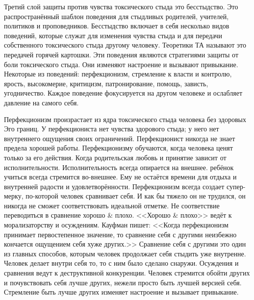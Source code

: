\documentclass[10pt, fleqn]{article}
\begin{document}
Третий слой защиты против чувства токсического стыда это бесстыдство. Это распространённый шаблон поведения для стыдливых родителей, учителей, политиков и проповедников. Бесстыдство включает в себя несколько видов поведений, которые служат для изменения чувства стыда и для передачи собственного токсического стыда другому человеку. Теоретики ТА называют это передачей горячей картошки. Эти поведения являются стратегиями защиты от боли токсического стыда. Они изменяют настроение и вызывают привыкание. Некоторые из поведений: перфекционизм, стремление к власти и контролю, ярость, высокомерие, критицизм, патронирование, помощь, зависть, угодничество. Каждое поведение фокусируется на другом человеке и ослабляет давление на самого себя.


Перфекционизм произрастает из ядра токсического стыда человека без здоровых Эго границ. У перфекциониста нет чувства здорового стыда; у него нет внутреннего ощущения своих ограничений. Перфекционист никогда не знает предела хорошей работы.
Перфекционизму обучаются, когда человека ценят только за его действия. Когда родительская любовь и принятие зависит от исполнительности. Исполнительность всегда опирается на внешнее. ребёнок учиться всегда стремится во-внешнее. Ему не остаётся времени для отдыха и внутренней радости и удовлетворённости.
Перфекционизм всегда создает супер-мерку, по-которой человек сравнивает себя. И как бы тяжело он не трудился, он никогда не сможет соответствовать идеальной отметке. Не соответствие переводиться в сравнение хорошо \& плохо. <<Хорошо \& плохо>> ведёт к морализаторству и осуждениям.
Кауфман пишет: <<Когда перфекционизм принимает первостепенное значение, то сравнение себя с другими неизбежно кончается ощущением себя хуже других.>>
Сравнение себя с другими это один из главных способов, которым человек продолжает себя стыдить уже внутренне. Человек делает внутри себя то, то с ним было сделано снаружи. Осуждения и сравнения ведут к деструктивной конкуренции. Человек стремится обойти других и почувствовать себя лучше других, нежели просто быть лучшей версией себя. Стремление быть лучше других изменяет настроение и вызывает привыкание.

\end{document}
